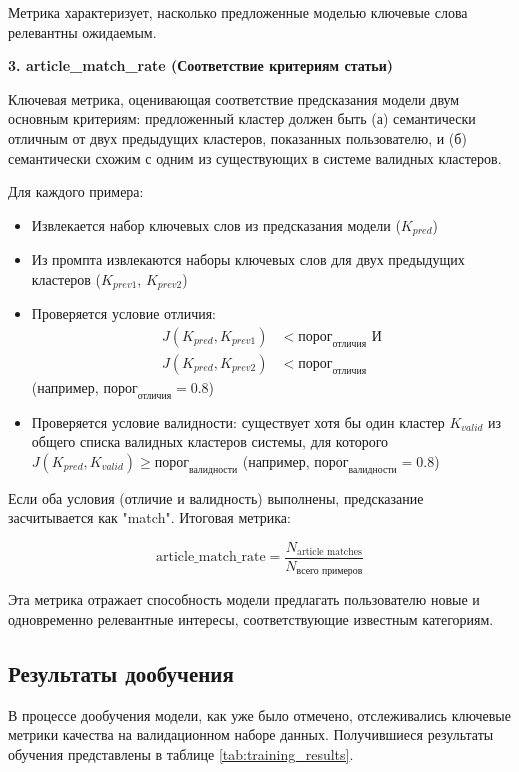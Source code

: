 Метрика характеризует, насколько предложенные моделью ключевые слова релевантны ожидаемым.

\textbf{3. article\_match\_rate (Соответствие критериям статьи)}

Ключевая метрика, оценивающая соответствие предсказания модели двум основным критериям: предложенный кластер должен быть (а) семантически отличным от двух предыдущих кластеров, показанных пользователю, и (б) семантически схожим с одним из существующих в системе валидных кластеров.

Для каждого примера:
\begin{itemize}
    \item Извлекается набор ключевых слов из предсказания модели ($K_{pred}$)
    \item Из промпта извлекаются наборы ключевых слов для двух предыдущих кластеров ($K_{prev1}$, $K_{prev2}$)
    \item Проверяется условие отличия: 
    \begin{align}
    J(K_{pred}, K_{prev1}) &< \text{порог}_{\text{отличия}} \text{ И} \\
    J(K_{pred}, K_{prev2}) &< \text{порог}_{\text{отличия}}
    \end{align}
    (например, $\text{порог}_{\text{отличия}} = 0.8$)
    \item Проверяется условие валидности: существует хотя бы один кластер $K_{valid}$ из общего списка валидных кластеров системы, для которого $J(K_{pred}, K_{valid}) \geq \text{порог}_{\text{валидности}}$ (например, $\text{порог}_{\text{валидности}} = 0.8$)
\end{itemize}

Если оба условия (отличие и валидность) выполнены, предсказание засчитывается как "match". Итоговая метрика:

\begin{equation}
\text{article\_match\_rate} = \frac{N_{\text{article matches}}}{N_{\text{всего примеров}}}
\end{equation}

Эта метрика отражает способность модели предлагать пользователю новые и одновременно релевантные интересы, соответствующие известным категориям.

\subsection*{Результаты дообучения}

В процессе дообучения модели, как уже было отмечено, отслеживались ключевые метрики качества на валидационном наборе данных. Получившиеся результаты обучения представлены в таблице \ref{tab:training_results}.

